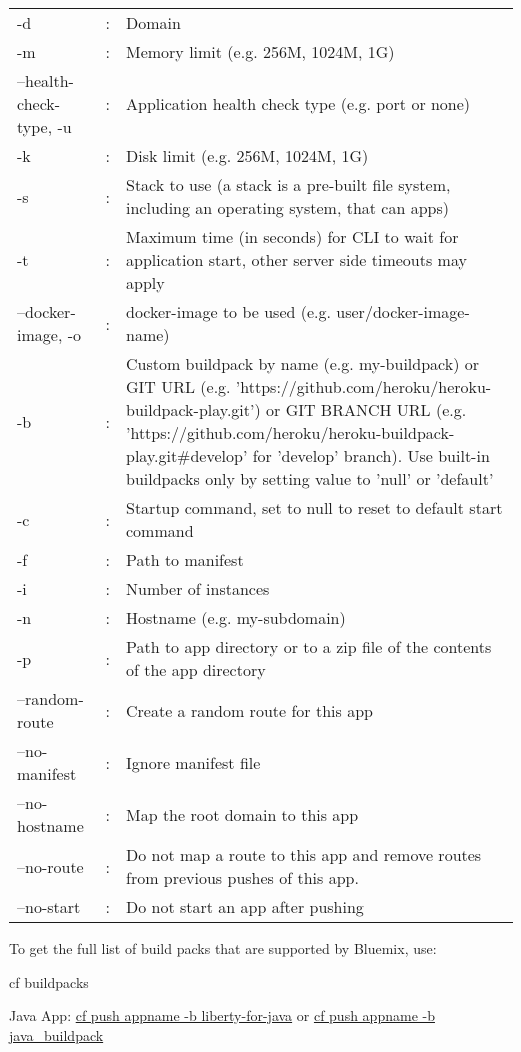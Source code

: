 \documentclass[]{book}
\begin{document}
\begin{tabular}{l  l p{8cm} }
-d&:& Domain\\
 -m &: & Memory limit (e.g. 256M, 1024M, 1G)\\
--health-check-type, -u      &:& Application health check type (e.g. port or none) \\
   -k& :&  Disk limit (e.g. 256M, 1024M, 1G)\\
-s & : & Stack to use (a stack is a pre-built file system, including an operating system, that can  apps)\\   
    -t & : & Maximum time (in seconds) for CLI to wait for application start, other server side timeouts may apply\\
--docker-image, -o & : & docker-image to be used (e.g. user/docker-image-name)\\
-b& : &  Custom buildpack by name (e.g. my-buildpack) or GIT URL (e.g. 'https://github.com/heroku/heroku-buildpack-play.git') or GIT BRANCH URL (e.g. 'https://github.com/heroku/heroku-buildpack-play.git\#develop' for 'develop' branch). Use built-in buildpacks only by setting value to 'null' or 'default'\\
-c&:& Startup command, set to null to reset to default start command\\
-f&:&    Path to manifest\\
-i &:& Number of instances\\
-n &:& Hostname (e.g. my-subdomain)\\
-p &:& Path to app directory or to a zip file of the contents of the app directory\\
--random-route &:& Create a random route for this app\\
--no-manifest &:& Ignore manifest file\\
--no-hostname  &:& Map the root domain to this app\\
--no-route &:& Do not map a route to this app and remove routes from previous pushes of this app.\\
--no-start &:& Do not start an app after pushing\\
\end{tabular}

To get the full list of build packs that are supported by Bluemix, use: 
\begin{code}
cf buildpacks
\end{code}


Java App: \underline{cf push appname -b liberty-for-java} or \underline{cf push appname -b java\_buildpack}
\end{document}
